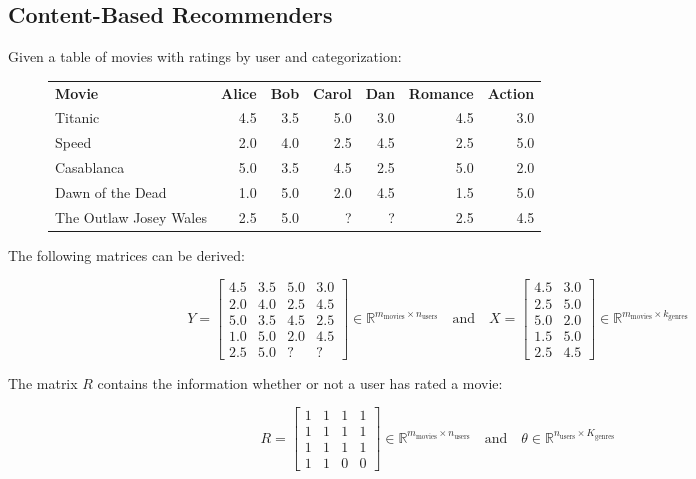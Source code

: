 \documentclass[a4paper,11pt]{scrartcl}
\begin{document}
\subsection{Content-Based Recommenders}

Given a table of movies with ratings by user and categorization:

\begin{figure}[H]
    \centering
    \begin{tabularx}{\linewidth}{l|r r r r|r r}
        \textbf{Movie} & \textbf{Alice} & \textbf{Bob} & \textbf{Carol} & \textbf{Dan} & \textbf{Romance} & \textbf{Action} \\
        \cline{1-7}
        Titanic & 4.5 & 3.5 & 5.0 & 3.0 & 4.5 & 3.0 \\
        Speed & 2.0 & 4.0 & 2.5 & 4.5 & 2.5 & 5.0 \\
        Casablanca & 5.0 & 3.5 & 4.5 & 2.5 & 5.0 & 2.0 \\
        Dawn of the Dead & 1.0 & 5.0 & 2.0 & 4.5 & 1.5 & 5.0 \\
        The Outlaw Josey Wales & 2.5 & 5.0 & ? & ? & 2.5 & 4.5 \\
    \end{tabularx}
\end{figure}

The following matrices can be derived:

$$ Y =
\begin{bmatrix}
    4.5 & 3.5 & 5.0 & 3.0 \\
    2.0 & 4.0 & 2.5 & 4.5 \\
    5.0 & 3.5 & 4.5 & 2.5 \\
    1.0 & 5.0 & 2.0 & 4.5 \\
    2.5 & 5.0 & ? & ? 
\end{bmatrix}
\in \mathbb{R}^{m_{\text{movies}} \times n_{\text{users}}}
\quad
\text{and}
\quad
X =
\begin{bmatrix}
    4.5 & 3.0 \\
    2.5 & 5.0 \\
    5.0 & 2.0 \\
    1.5 & 5.0 \\
    2.5 & 4.5
\end{bmatrix}
\in \mathbb{R}^{m_{\text{movies}} \times k_{\text{genres}}} $$

The matrix $R$ contains the information whether or not a user has rated a movie:

$$ R =
\begin{bmatrix}
    1 & 1 & 1 & 1 \\
    1 & 1 & 1 & 1 \\
    1 & 1 & 1 & 1 \\
    1 & 1 & 0 & 0
\end{bmatrix}
\in \mathbb{R}^{m_{\text{movies}} \times n_{\text{users}}}
\quad
\text{and}
\quad
\theta \in \mathbb{R}^{n_{\text{users}} \times K_{\text{genres}}} $$
\end{document}
